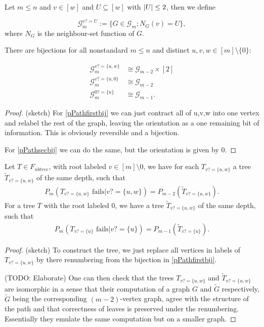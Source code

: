 \begin{defi}
Let $m\leq n$ and $v\in [w]$ and $U\subseteq [w]$ with $\left|{U}\right|\leq 2$, then we define 

\[\mathcal{G}_m^{v?=U}:=\{G\in\mathcal{G}_m;N_G(v)=U\},\]
where $N_G$ is the neighbour-set function of $G$.
\end{defi}
\begin{lemm}
There are bijections for all nonstandard $m\leq n$ and distinct $u,v,w\in [m]\setminus\{0\}$:

\begin{align}
\mathcal{G}_m^{v?=\{u,w\}}&\cong\mathcal{G}_{m-2}\times [2] \label{pPathfirstbij}\\
\mathcal{G}_m^{v?=\{u,0\}}&\cong\mathcal{G}_{m-2}\label{pPathsecbij}\\
\mathcal{G}_m^{0?=\{u\}}&\cong\mathcal{G}_{m-1}\label{pPaththrdbij}.
\end{align}
\end{lemm}
\begin{proof} (sketch)
For \eqref{pPathfirstbij} we can just contract all of {u,v,w} into one vertex and relabel the rest of the graph, leaving the orientation as a one remaining bit of information. This is obviously reversible and a bijection.

For \eqref{pPathsecbij} we can do the same, but the orientation is given by $0$.
\end{proof}

\begin{lemm}\label{lemmrelabeltree}
Let $T\in F_{nbtree}$, with root labeled $v\in[m]\setminus{0}$, we have for each $T_{v?=\{u,w\}}$ a tree $\tilde T_{v?=\{u,w\}}$ of the same depth, such that
\begin{align}
P_m(T_{v?=\{u,w\}}\text{ fails}|v?=\{u,w\})=P_{m-2}(\tilde T_{v?=\{u,w\}}).
\end{align}
For a tree $T$ with the root labeled $0$, we have a tree $\tilde T_{v?=\{u,w\}}$ of the same depth, such that
\begin{align}
P_m(T_{v?=\{u\}}\text{ fails}|v?=\{u\})=P_{m-1}(\tilde T_{v?=\{u\}}).
\end{align}
\end{lemm}
\begin{proof}(sketch) To construct the tree, we just replace all vertices in labels of $T_{v?=\{u,w\}}$ by there renumbering from the bijection in \eqref{pPathfirstbij}.

(TODO: Elaborate) One can then check that the trees $T_{v?=\{u,w\}}$ and $\tilde T_{v?=\{u,w\}}$ are isomorphic in a sense that their computation of a graph $G$ and $\tilde G$ respectively, $\tilde G$ being the corresponding $(m-2)$-vertex graph, agree with the structure of the path and that correctness of leaves is preserved under the renumbering. Essentially they emulate the same computation but on a smaller graph.
\end{proof}


